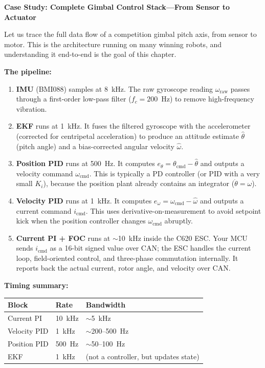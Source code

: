 \vspace{0.5em}
\begin{mdframed}[linewidth=1pt, innertopmargin=10pt, innerbottommargin=10pt]
\textbf{Case Study: Complete Gimbal Control Stack---From Sensor to Actuator}

\vspace{0.3em}
Let us trace the full data flow of a competition gimbal pitch axis, from sensor to motor. This is the architecture running on many winning robots, and understanding it end-to-end is the goal of this chapter.

\textbf{The pipeline:}

\begin{enumerate}[nosep]
    \item \textbf{IMU} (BMI088) samples at 8~kHz. The raw gyroscope reading $\omega_{\text{raw}}$ passes through a first-order low-pass filter ($f_c = 200$~Hz) to remove high-frequency vibration.
    \item \textbf{EKF} runs at 1~kHz. It fuses the filtered gyroscope with the accelerometer (corrected for centripetal acceleration) to produce an attitude estimate $\hat{\theta}$ (pitch angle) and a bias-corrected angular velocity $\hat{\omega}$.
    \item \textbf{Position PID} runs at 500~Hz. It computes $e_\theta = \theta_{\text{cmd}} - \hat{\theta}$ and outputs a velocity command $\omega_{\text{cmd}}$. This is typically a PD controller (or PID with a very small $K_i$), because the position plant already contains an integrator ($\dot{\theta} = \omega$).
    \item \textbf{Velocity PID} runs at 1~kHz. It computes $e_\omega = \omega_{\text{cmd}} - \hat{\omega}$ and outputs a current command $i_{\text{cmd}}$. This uses derivative-on-measurement to avoid setpoint kick when the position controller changes $\omega_{\text{cmd}}$ abruptly.
    \item \textbf{Current PI + FOC} runs at $\sim$10~kHz inside the C620 ESC. Your MCU sends $i_{\text{cmd}}$ as a 16-bit signed value over CAN; the ESC handles the current loop, field-oriented control, and three-phase commutation internally. It reports back the actual current, rotor angle, and velocity over CAN.
\end{enumerate}

\textbf{Timing summary:}
\begin{center}
\begin{tabular}{l l l}
\hline
\textbf{Block} & \textbf{Rate} & \textbf{Bandwidth} \\
\hline
Current PI & 10~kHz & $\sim$5~kHz \\
Velocity PID & 1~kHz & $\sim$200--500~Hz \\
Position PID & 500~Hz & $\sim$50--100~Hz \\
EKF & 1~kHz & (not a controller, but updates state) \\
\hline
\end{tabular}
\end{center}


\end{mdframed}
